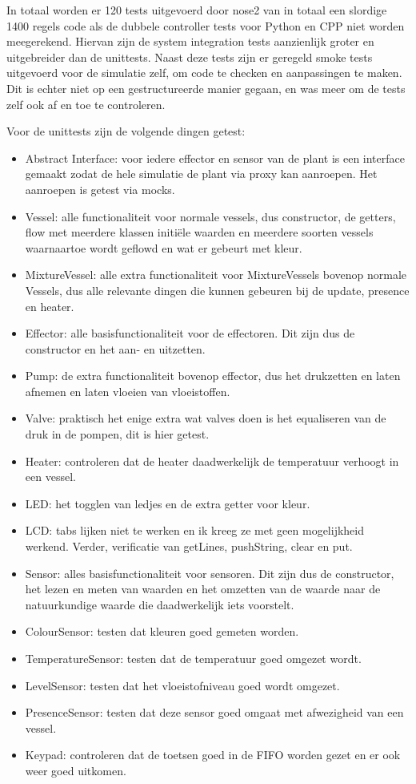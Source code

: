 \documentclass{article}
\begin{document}
	In totaal worden er 120 tests uitgevoerd door nose2 van in totaal een slordige 1400 regels code als de dubbele controller tests voor Python en CPP niet worden meegerekend. Hiervan zijn de system integration tests aanzienlijk groter en uitgebreider dan de unittests. Naast deze tests zijn er geregeld smoke tests uitgevoerd voor de simulatie zelf, om code te checken en aanpassingen te maken. Dit is echter niet op een gestructureerde manier gegaan, en was meer om de tests zelf ook af en toe te controleren. 
	
	Voor de unittests zijn de volgende dingen getest:
	\begin{itemize}
		\item Abstract Interface: voor iedere effector en sensor van de plant is een interface gemaakt zodat de hele simulatie de plant via proxy kan aanroepen. Het aanroepen is getest via mocks.
		\item Vessel: alle functionaliteit voor normale vessels, dus constructor, de getters, flow met meerdere klassen initi\"ele waarden en meerdere soorten vessels waarnaartoe wordt geflowd en wat er gebeurt met kleur.
		\item MixtureVessel: alle extra functionaliteit voor MixtureVessels bovenop normale Vessels, dus alle relevante dingen die kunnen gebeuren bij de update, presence en heater.
		\item Effector: alle basisfunctionaliteit voor de effectoren. Dit zijn dus de constructor en het aan- en uitzetten.
		\item Pump: de extra functionaliteit bovenop effector, dus het drukzetten en laten afnemen en laten vloeien van vloeistoffen.
		\item Valve: praktisch het enige extra wat valves doen is het equaliseren van de druk in de pompen, dit is hier getest.
		\item Heater: controleren dat de heater daadwerkelijk de temperatuur verhoogt in een vessel.
		\item LED: het togglen van ledjes en de extra getter voor kleur.
		\item LCD: tabs lijken niet te werken en ik kreeg ze met geen mogelijkheid werkend. Verder, verificatie van getLines, pushString, clear en put.
		\item Sensor: alles basisfunctionaliteit voor sensoren. Dit zijn dus de constructor, het lezen en meten van waarden en het omzetten van de waarde naar de natuurkundige waarde die daadwerkelijk iets voorstelt.
		\item ColourSensor: testen dat kleuren goed gemeten worden.
		\item TemperatureSensor: testen dat de temperatuur goed omgezet wordt.
		\item LevelSensor: testen dat het vloeistofniveau goed wordt omgezet.
		\item PresenceSensor: testen dat deze sensor goed omgaat met afwezigheid van een vessel.
		\item Keypad: controleren dat de toetsen goed in de FIFO worden gezet en er ook weer goed uitkomen.
	\end{itemize}
\end{document}

